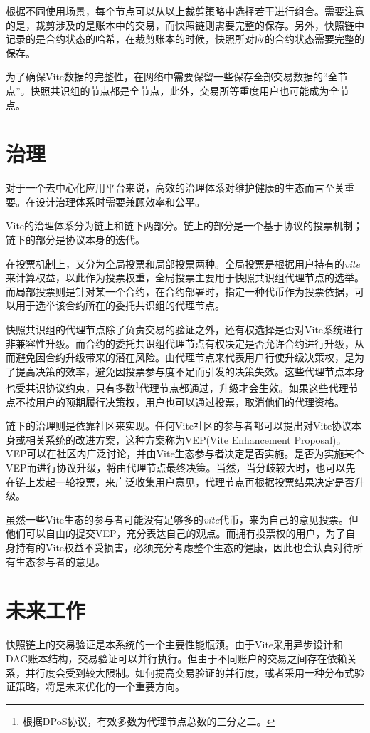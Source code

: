 \documentclass[UTF8,nofonts]{ctexart}
\begin{document}
\begin{multicols}{2}
根据不同使用场景，每个节点可以从以上裁剪策略中选择若干进行组合。需要注意的是，裁剪涉及的是账本中的交易，而快照链则需要完整的保存。另外，快照链中记录的是合约状态的哈希，在裁剪账本的时候，快照所对应的合约状态需要完整的保存。

为了确保Vite数据的完整性，在网络中需要保留一些保存全部交易数据的“全节点”。快照共识组的节点都是全节点，此外，交易所等重度用户也可能成为全节点。

\section{治理}
对于一个去中心化应用平台来说，高效的治理体系对维护健康的生态而言至关重要。在设计治理体系时需要兼顾效率和公平。

Vite的治理体系分为链上和链下两部分。链上的部分是一个基于协议的投票机制；链下的部分是协议本身的迭代。

在投票机制上，又分为全局投票和局部投票两种。全局投票是根据用户持有的\textit{vite}来计算权益，以此作为投票权重，全局投票主要用于快照共识组代理节点的选举。而局部投票则是针对某一个合约，在合约部署时，指定一种代币作为投票依据，可以用于选举该合约所在的委托共识组的代理节点。

快照共识组的代理节点除了负责交易的验证之外，还有权选择是否对Vite系统进行非兼容性升级。而合约的委托共识组代理节点有权决定是否允许合约进行升级，从而避免因合约升级带来的潜在风险。由代理节点来代表用户行使升级决策权，是为了提高决策的效率，避免因投票参与度不足而引发的决策失效。这些代理节点本身也受共识协议约束，只有多数\footnote{根据DPoS协议，有效多数为代理节点总数的三分之二。}代理节点都通过，升级才会生效。如果这些代理节点不按用户的预期履行决策权，用户也可以通过投票，取消他们的代理资格。

链下的治理则是依靠社区来实现。任何Vite社区的参与者都可以提出对Vite协议本身或相关系统的改进方案，这种方案称为VEP(Vite Enhancement Proposal)。VEP可以在社区内广泛讨论，并由Vite生态参与者决定是否实施。是否为实施某个VEP而进行协议升级，将由代理节点最终决策。当然，当分歧较大时，也可以先在链上发起一轮投票，来广泛收集用户意见，代理节点再根据投票结果决定是否升级。

虽然一些Vite生态的参与者可能没有足够多的\textit{vite}代币，来为自己的意见投票。但他们可以自由的提交VEP，充分表达自己的观点。而拥有投票权的用户，为了自身持有的Vite权益不受损害，必须充分考虑整个生态的健康，因此也会认真对待所有生态参与者的意见。

\section{未来工作}
快照链上的交易验证是本系统的一个主要性能瓶颈。由于Vite采用异步设计和DAG账本结构，交易验证可以并行执行。但由于不同账户的交易之间存在依赖关系，并行度会受到较大限制。如何提高交易验证的并行度，或者采用一种分布式验证策略，将是未来优化的一个重要方向。


\end{multicols}
\end{document}
